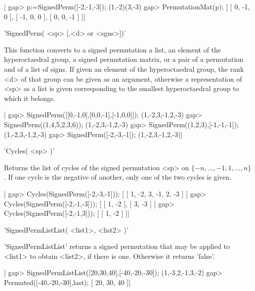 |    gap> p:=SignedPerm([-2,-1,-3]);
    (1,-2)(3,-3)
    gap> PermutationMat(p);
    [ [ 0, -1, 0 ], [ -1, 0, 0 ], [ 0, 0, -1 ] ]|

%
%

'SignedPerm( <sp> [,<d> or <sgns>])'

This  function converts to a  signed permutation a list,  an element of the
hyperoctaedral  group,  a  signed  permutation  matrix,  or  a  pair  of  a
permutation   and  of  a  list  of  signs.  If  given  an  element  of  the
hyperoctaedral  group,  the  rank  <d>  of  that  group  can be given as an
argument,   otherwise  a  representation  of  <sp>   as  a  list  is  given
corresponding to the smallest hyperoctaedral group to which it belongs.

|    gap> SignedPerm([[0,-1,0],[0,0,-1],[-1,0,0]]);
    (1,-2,3,-1,2,-3)
    gap> SignedPerm((1,4,5,2,3,6));
    (1,-2,3,-1,2,-3)
    gap> SignedPerm((1,2,3),[-1,-1,-1]);
    (1,-2,3,-1,2,-3)
    gap> SignedPerm([-2,-3,-1]);
    (1,-2,3,-1,2,-3)|

%
%

'Cycles( <sp> )'

Returns   the  list   of  cycles   of  the   signed  permutation   <sp>  on
$\{-n,\ldots,-1,1,\ldots,n\}$.  If one  cycle is  the negative  of another,
only one of the two cycles is given.

|    gap> Cycles(SignedPerm([-2,-3,-1]));
    [ [ 1, -2, 3, -1, 2, -3 ] ]
    gap> Cycles(SignedPerm([-2,-1,-3]));
    [ [ 1, -2 ], [ 3, -3 ] ]
    gap> Cycles(SignedPerm([-2,-1,3]));
    [ [ 1, -2 ] ]|

%
%

    'SignedPermListList( <list1>, <list2> )'

'SignedPermListList'  returns a signed  permutation that may  be applied to
<list1> to obtain <list2>, if there is one. Otherwise it returns 'false'.

|    gap> SignedPermListList([20,30,40],[-40,-20,-30]);
    (1,-3,2,-1,3,-2)
    gap> Permuted([-40,-20,-30],last);
    [ 20, 30, 40 ]|

%
%

